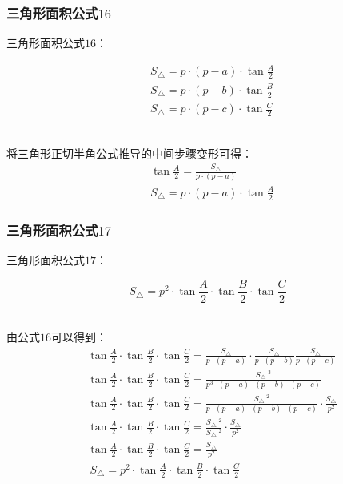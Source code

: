 \documentclass[UTF8]{ctexart}
\begin{document}
\subsubsection{三角形面积公式$16$}
    三角形面积公式$16$：
    \begin{large}
        \begin{align*}
            &S_{\triangle}=p\cdot(p-a)\cdot\tan{\frac{A}{2}}\\[3mm]
            &S_{\triangle}=p\cdot(p-b)\cdot\tan{\frac{B}{2}}\\[3mm]
            &S_{\triangle}=p\cdot(p-c)\cdot\tan{\frac{C}{2}}
        \end{align*}
    \end{large}\\
    将三角形正切半角公式推导的中间步骤变形可得：\vspace{5pt}
    \setcounter{equation}{0}
    \begin{align}
        &\tan{\frac{A}{2}}=\frac{S_{\triangle}}{p\cdot(p-a)}\\[3mm]
        &S_{\triangle}=p\cdot(p-a)\cdot\tan{\frac{A}{2}}
    \end{align}

\subsubsection{三角形面积公式$17$}
    三角形面积公式$17$：
    \begin{large}
        \begin{equation*}
            S_{\triangle}=p^2\cdot\tan{\frac{A}{2}}\cdot\tan{\frac{B}{2}}\cdot\tan{\frac{C}{2}}
        \end{equation*}
    \end{large}\\
    由公式$16$可以得到：\vspace{5pt}
    \setcounter{equation}{0}
    \begin{align}
        &\tan{\frac{A}{2}}\cdot\tan{\frac{B}{2}}\cdot\tan{\frac{C}{2}}=\frac{S_{\triangle}}{p\cdot(p-a)}\cdot\frac{S_{\triangle}}{p\cdot(p-b)}\frac{S_{\triangle}}{p\cdot(p-c)}\\[3mm]
        &\tan{\frac{A}{2}}\cdot\tan{\frac{B}{2}}\cdot\tan{\frac{C}{2}}=\frac{S_{\triangle}~^3}{p^3\cdot(p-a)\cdot(p-b)\cdot(p-c)}\\[3mm]
        &\tan{\frac{A}{2}}\cdot\tan{\frac{B}{2}}\cdot\tan{\frac{C}{2}}=\frac{S_{\triangle}~^2}{p\cdot(p-a)\cdot(p-b)\cdot(p-c)}\cdot\frac{S_{\triangle}}{p^2}\\[3mm]
        &\tan{\frac{A}{2}}\cdot\tan{\frac{B}{2}}\cdot\tan{\frac{C}{2}}=\frac{S_{\triangle}~^2}{S_{\triangle}~^2}\cdot\frac{S_{\triangle}}{p^2}\\[3mm]
        &\tan{\frac{A}{2}}\cdot\tan{\frac{B}{2}}\cdot\tan{\frac{C}{2}}=\frac{S_{\triangle}}{p^2}\\[3mm]
        &~S_{\triangle}=p^2\cdot\tan{\frac{A}{2}}\cdot\tan{\frac{B}{2}}\cdot\tan{\frac{C}{2}}
    \end{align}
\end{document}
